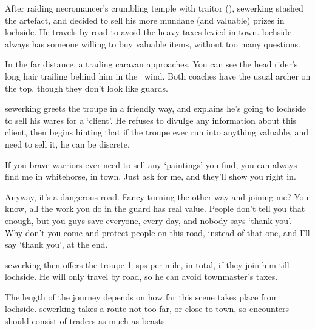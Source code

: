 \begin{exampletext}
  After raiding \gls{necromancer}'s crumbling temple with \gls{traitor} (), \gls{sewerking} stashed the \gls{artefact}, and decided to sell his more mundane (and valuable) prizes in \gls{lochside}.
  He travels by road to avoid the heavy taxes levied in \gls{town}.
  \Gls{lochside} always has someone willing to buy valuable items, without too many questions.
\end{exampletext}

\begin{boxtext}
  In the far distance, a trading caravan approaches.
  You can see the head rider's long hair trailing behind him in the \showTemperature\ wind.
  Both coaches have the usual archer on the top, though they don't look like \glspl{guard}.
\end{boxtext}

\setcounter{wounds}{2}

\sewerking

\Gls{sewerking} greets the troupe in a friendly way, and explains he's going to \gls{lochside} to sell his wares for a `client'.
He refuses to divulge any information about this client, then begins hinting that if the troupe ever run into anything valuable, and need to sell it, he can be discrete.


\null
\begin{speechtext}
  If you brave warriors ever need to sell any `paintings' you find, you can always find me in \gls{whitehorse}, in \gls{town}.
  Just ask for me, and they'll show you right in.

  Anyway, it's a dangerous road.
  Fancy turning the other way and joining me?
  You know, all the work you do in the \gls{guard} has real value.
  People don't tell you that enough, but you guys save everyone, every day, and nobody says `thank you'.
  Why don't you come and protect people on this road, instead of that one, and I'll say `thank you', at the end.
\end{speechtext}

\Gls{sewerking} then offers the troupe 1~\glspl{sp} per mile, in total, if they join him till \gls{lochside}.
He will only travel by road, so he can avoid \gls{townmaster}'s taxes.

The length of the journey depends on how far this scene takes place from \gls{lochside}.
\Gls{sewerking} takes a route not too far, or close to town, so encounters should consist of traders as much as beasts.

